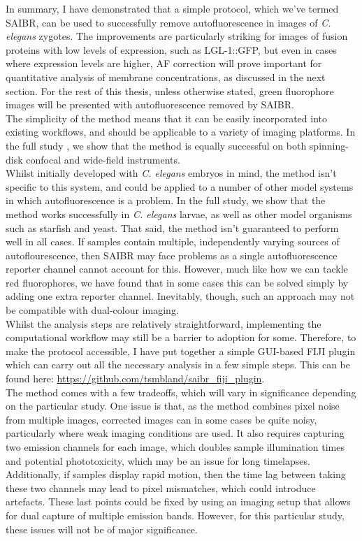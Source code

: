 \documentclass[12pt]{"article"}
\begin{document}
In summary, I have demonstrated that a simple protocol, which we’ve termed SAIBR, can be used to successfully remove autofluorescence in images of \textit{C. elegans} zygotes. The improvements are particularly striking for images of fusion proteins with low levels of expression, such as LGL-1::GFP, but even in cases where expression levels are higher, AF correction will prove important for quantitative analysis of membrane concentrations, as discussed in the next section. For the rest of this thesis, unless otherwise stated, green fluorophore images will be presented with autofluorescence removed by SAIBR.\\

The simplicity of the method means that it can be easily incorporated into existing workflows, and should be applicable to a variety of imaging platforms. In the full study \citep{Rodrigues2022}, we show that the method is equally successful on both spinning-disk confocal and wide-field instruments. \\

Whilst initially developed with \textit{C. elegans} embryos in mind, the method isn't specific to this system, and could be applied to a number of other model systems in which autofluorescence is a problem. In the full study, we show that the method works successfully in \textit{C. elegans} larvae, as well as other model organisms such as starfish and yeast. That said, the method isn’t guaranteed to perform well in all cases. If samples contain multiple, independently varying sources of autoflourescence, then SAIBR may face problems as a single autofluorescence reporter channel cannot account for this. However, much like how we can tackle red fluorophores, we have found that in some cases this can be solved simply by adding one extra reporter channel. Inevitably, though, such an approach may not be compatible with dual-colour imaging. \\

Whilst the analysis steps are relatively straightforward, implementing the computational workflow may still be a barrier to adoption for some. Therefore, to make the protocol accessible, I have put together a simple GUI-based FIJI plugin which can carry out all the necessary analysis in a few simple steps. This can be found here: \url{https://github.com/tsmbland/saibr_fiji_plugin}. \\

The method comes with a few tradeoffs, which will vary in significance depending on the particular study. One issue is that, as the method combines pixel noise from multiple images, corrected images can in some cases be quite noisy, particularly where weak imaging conditions are used. It also requires capturing two emission channels for each image, which doubles sample illumination times and potential phototoxicity, which may be an issue for long timelapses. Additionally, if samples display rapid motion, then the time lag between taking these two channels may lead to pixel mismatches, which could introduce artefacts. These last points could be fixed by using an imaging setup that allows for dual capture of multiple emission bands. However, for this particular study, these issues will not be of major significance. \\
\end{document}
